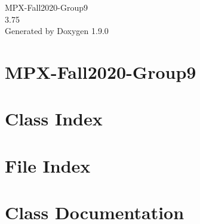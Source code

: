 \let\mypdfximage\pdfximage\def\pdfximage{\immediate\mypdfximage}\documentclass[twoside]{book}
\newcommand{\+}{\discretionary{\mbox{\scriptsize$\hookleftarrow$}}{}{}}
\newcommand{\clearemptydoublepage}{%
  \newpage{\pagestyle{empty}\cleardoublepage}%
}
\begin{document}
\hypersetup{pageanchor=false,
             bookmarksnumbered=true,
             pdfencoding=unicode
            }
\begin{titlepage}
\vspace*{7cm}
\begin{center}%
{\Large M\+P\+X-\/\+Fall2020-\/\+Group9 \\[1ex]\large 3.\+75 }\\
\vspace*{1cm}
{\large Generated by Doxygen 1.9.0}\\
\end{center}
\end{titlepage}
\clearemptydoublepage
{}
\tableofcontents
\clearemptydoublepage
{}
\hypersetup{pageanchor=true}

\chapter{M\+P\+X-\/\+Fall2020-\/\+Group9}
\label{md_README}

\chapter{Class Index}

\chapter{File Index}

\chapter{Class Documentation}



















\end{document}
